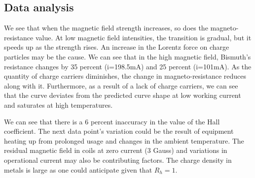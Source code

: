         

        

    \subsection{Data analysis}
    We see that when the magnetic field strength increases, so does the magneto-resistance value. At low magnetic field intensities, the transition is gradual, but it speeds up as the strength rises. An increase in the Lorentz force on charge particles may be the cause. We can see that in the high magnetic field, Bismuth's resistance changes by 35 percent (i=198.5mA) and 25 percent (i=101mA). As the quantity of charge carriers diminishes, the change in magneto-resistance reduces along with it. Furthermore, as a result of a lack of charge carriers, we can see that the curve deviates from the predicted curve shape at low working current and saturates at high temperatures.

    We can see that there is a 6 percent inaccuracy in the value of the Hall coefficient. The next data point's variation could be the result of equipment heating up from prolonged usage and changes in the ambient temperature. The residual magnetic field in coils at zero current (3 Gauss) and variations in operational current may also be contributing factors. The charge density in metals is large as one could anticipate given that $R_h = 1$.